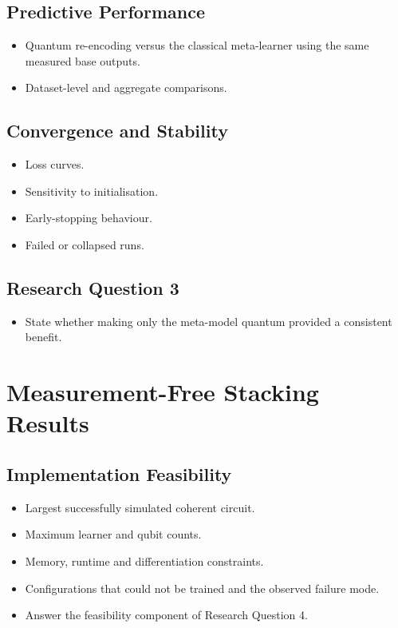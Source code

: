\documentclass[]{UCD_CS_MSc_AAI_Report}
\begin{document}
\subsection{Predictive Performance}
\begin{itemize}
    \item Quantum re-encoding versus the classical meta-learner using the same measured base outputs.
    \item Dataset-level and aggregate comparisons.
\end{itemize}

\subsection{Convergence and Stability}
\begin{itemize}
    \item Loss curves.
    \item Sensitivity to initialisation.
    \item Early-stopping behaviour.
    \item Failed or collapsed runs.
\end{itemize}

\subsection{Research Question 3}
\begin{itemize}
    \item State whether making only the meta-model quantum provided a consistent benefit.
\end{itemize}

\section{Measurement-Free Stacking Results}
\label{sec:results-coherent}

\subsection{Implementation Feasibility}
\begin{itemize}
    \item Largest successfully simulated coherent circuit.
    \item Maximum learner and qubit counts.
    \item Memory, runtime and differentiation constraints.
    \item Configurations that could not be trained and the observed failure mode.
    \item Answer the feasibility component of Research Question 4.
\end{itemize}
\end{document}
